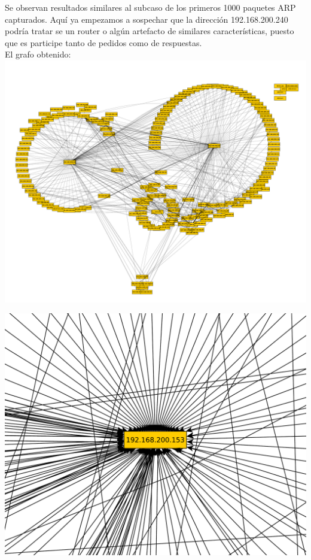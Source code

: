 \indent  Se observan resultados similares al subcaso de los primeros 1000 paquetes ARP capturados. Aquí ya empezamos a sospechar que la dirección 192.168.200.240 podría tratar se un router o algún artefacto de similares características, puesto que es participe tanto de pedidos como de respuestas.\\

\indent El grafo obtenido:\\

\includegraphics[scale=0.5,clip=true,trim=20 0 0 0]{graphics/laburomediano.pdf}

\includegraphics[scale=0.3,clip=true,trim=20 0 0 0]{graphics/laburomediano153.pdf}

